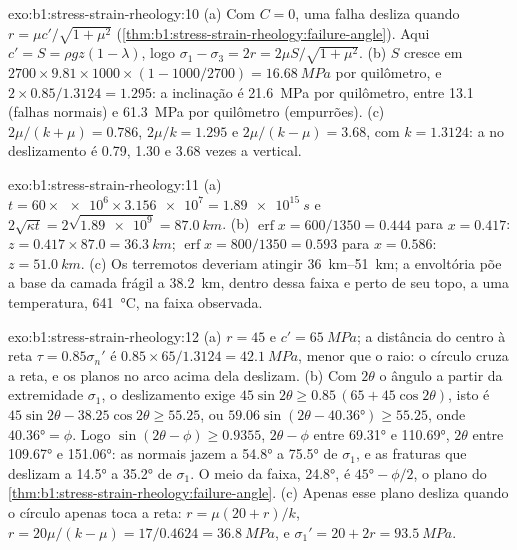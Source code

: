 \begin{solution}{exo:b1:stress-strain-rheology:10}
(a) Com $C = 0$, uma falha desliza quando $r = \mu c'/\sqrt{1+\mu^2}$
(\cref{thm:b1:stress-strain-rheology:failure-angle}). Aqui $c' = S =
\rho g z(1-\lambda)$, logo $\sigma_1 - \sigma_3 = 2r = 2\mu S/\sqrt{1+\mu^2}$.
(b) $S$ cresce em $2700\times9.81\times1000\times(1 - 1000/2700) =
\qty{16.68}{MPa}$ por quilômetro, e $2\times0.85/1.3124 = 1.295$: a inclinação
é \qty{21.6}{MPa} por quilômetro, entre \num{13.1} (falhas normais) e
\qty{61.3}{MPa} por quilômetro (empurrões). (c) $2\mu/(k+\mu) = 0.786$,
$2\mu/k = 1.295$ e $2\mu/(k-\mu) = 3.68$, com $k = 1.3124$: a  no deslizamento é 0.79, 1.30 e 3.68 vezes a  vertical.
\end{solution}

\begin{solution}{exo:b1:stress-strain-rheology:11}
(a) $t = 60\times\num{e6}\times\num{3.156e7} = \qty{1.89e15}{s}$ e
$2\sqrt{\kappa t} = 2\sqrt{\num{1.89e9}} = \qty{87.0}{km}$. (b)
$\operatorname{erf}x = 600/1350 = 0.444$ para $x = 0.417$: $z = 0.417\times87.0
= \qty{36.3}{km}$; $\operatorname{erf}x = 800/1350 = 0.593$ para $x = 0.586$:
$z = \qty{51.0}{km}$. (c) Os terremotos deveriam atingir \qtyrange{36}{51}{km}; a envoltória põe a base da camada frágil a \qty{38.2}{km}, dentro dessa faixa e perto de seu topo, a uma temperatura, \qty{641}{\degreeCelsius}, na faixa observada.
\end{solution}

\begin{solution}{exo:b1:stress-strain-rheology:12}
(a) $r = 45$ e $c' = \qty{65}{MPa}$; a distância do centro à reta
$\tau = 0.85\sigma_n'$ é $0.85\times65/1.3124 = \qty{42.1}{MPa}$, menor que o raio: o círculo cruza a reta, e os planos no arco acima dela deslizam. (b) Com $2\theta$ o ângulo a partir da extremidade $\sigma_1$, o deslizamento exige
$45\sin2\theta \ge 0.85\,(65 + 45\cos2\theta)$, isto é
$45\sin2\theta - 38.25\cos2\theta \ge 55.25$, ou
$59.06\sin(2\theta - \ang{40.36}) \ge 55.25$, onde $\ang{40.36} = \phi$.
Logo $\sin(2\theta - \phi) \ge 0.9355$, $2\theta - \phi$ entre \ang{69.31}
e \ang{110.69}, $2\theta$ entre \ang{109.67} e \ang{151.06}: as normais jazem a \ang{54.8} a \ang{75.5} de $\sigma_1$, e as fraturas que deslizam a \ang{14.5} a \ang{35.2} de $\sigma_1$. O meio da faixa,
\ang{24.8}, é $\ang{45} - \phi/2$, o plano do
\cref{thm:b1:stress-strain-rheology:failure-angle}. (c) Apenas esse plano desliza
quando o círculo apenas toca a reta: $r = \mu(20 + r)/k$, $r = 20\mu/(k -
\mu) = 17/0.4624 = \qty{36.8}{MPa}$, e $\sigma_1' = 20 + 2r =
\qty{93.5}{MPa}$.
\end{solution}

